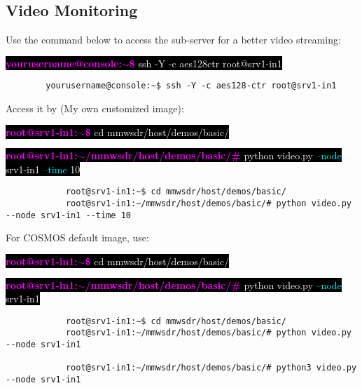 \documentclass{article}
\begin{document}
    \subsection{Video Monitoring}
    Use the command below to access the sub-server for a better video streaming:
    
    \colorbox{black}{\textcolor{magenta}{\textbf{yourusername@console:$\sim$\$ }}  \textcolor{white}{\large ssh -Y -c aes128\-ctr root@srv1-in1}}

    \begin{verbatim}
        yourusername@console:∼$ ssh -Y -c aes128-ctr root@srv1-in1
    \end{verbatim}
    
    Access it by (My own customized image):

        \colorbox{black}{\textcolor{magenta}{\textbf{root@srv1-in1:$\sim$\$ }}  \textcolor{white}{\large cd mmwsdr/host/demos/basic/}}
        
        \colorbox{black}{\textcolor{magenta}{\textbf{root@srv1-in1:$\sim$/mmwsdr/host/demos/basic/\# }}  \textcolor{white}{\large python video.py} \textcolor{cyan}{--node} \textcolor{white}{srv1-in1}  \textcolor{cyan}{--time} \textcolor{white}{10}}
        
        \begin{verbatim}
            root@srv1-in1:∼$ cd mmwsdr/host/demos/basic/
            root@srv1-in1:∼/mmwsdr/host/demos/basic/# python video.py --node srv1-in1 --time 10
        \end{verbatim}
        
        For COSMOS default image, use:
        
        \colorbox{black}{\textcolor{magenta}{\textbf{root@srv1-in1:$\sim$\$ }}  \textcolor{white}{\large cd mmwsdr/host/demos/basic/}}
        
        \colorbox{black}{\textcolor{magenta}{\textbf{root@srv1-in1:$\sim$/mmwsdr/host/demos/basic/\# }}  \textcolor{white}{\large python video.py} \textcolor{cyan}{--node} \textcolor{white}{srv1-in1}}
        
        \begin{verbatim}
            root@srv1-in1:∼$ cd mmwsdr/host/demos/basic/
            root@srv1-in1:∼/mmwsdr/host/demos/basic/# python video.py --node srv1-in1
            
            root@srv1-in1:∼/mmwsdr/host/demos/basic/# python3 video.py --node srv1-in1
        \end{verbatim}
            
\end{document}

